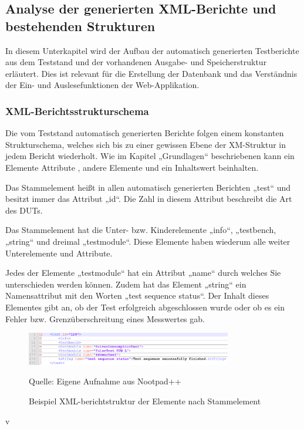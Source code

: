 \subsection{Analyse der generierten XML-Berichte und bestehenden Strukturen}
\label{subsec:analyse-der-generierten-xml-berichte-und-bestehenden-strukturen}

In diesem Unterkapitel wird der Aufbau der automatisch generierten Testberichte aus dem Teststand und der vorhandenen Ausgabe- und Speicherstruktur erläutert. Dies ist relevant für die Erstellung der Datenbank und das Verständnis der Ein- und Auslesefunktionen der Web-Applikation.


\subsubsection{XML-Berichtsstrukturschema}

Die vom Teststand automatisch generierten Berichte folgen einem konstanten Strukturschema, welches sich bis zu einer gewissen Ebene der XM-Struktur in jedem Bericht wiederholt. Wie im Kapitel „Grundlagen“ beschriebenen kann ein Elemente Attribute , andere Elemente und ein Inhaltswert beinhalten.

Das Stammelement heißt in allen automatisch generierten Berichten „test“ und besitzt immer das Attribut „id“. Die Zahl in diesem Attribut beschreibt die Art des \ac{DUTs}.

Das Stammelement hat die Unter- bzw. Kinderelemente „info“, „testbench, „string“ und dreimal „testmodule“. Diese Elemente haben wiederum alle weiter Unterelemente und Attribute.

Jedes der Elemente „testmodule“ hat ein Attribut „name“ durch welches Sie unterschieden werden können. Zudem hat das Element „string“ ein Namensattribut mit den Worten „test sequence status“. Der Inhalt dieses Elementes gibt an, ob der Test erfolgreich abgeschlossen wurde oder ob es ein Fehler bzw. Grenzüberschreitung eines Messwertes gab.

\begin{figure}[h]
    \centering
    \includegraphics[width=0.8\textwidth]{Grafiken/Obere_XML-Berichtstruktur(1).png}
    \caption{Beispiel XML-berichtstruktur der Elemente nach Stammelement}
    \label{fig:3. Beispiel XML-berichtstruktur Elemente nach Stammelement}
    {Quelle: Eigene Aufnahme aus Nootpad++}
\end{figure} v